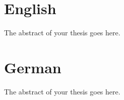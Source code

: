 \section{English}

The abstract of your thesis goes here.

\lipsum[1-2]

\section{German}

The abstract of your thesis goes here.

\lipsum[1-2]